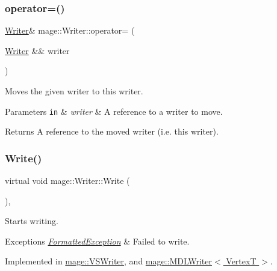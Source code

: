 \subsubsection{\texorpdfstring{operator=()}{operator=()}\hspace{0.1cm}{\footnotesize\ttfamily [2/2]}}
{\footnotesize\ttfamily \hyperlink{classmage_1_1_writer}{Writer}\& mage\+::\+Writer\+::operator= (\begin{DoxyParamCaption}\item[{\hyperlink{classmage_1_1_writer}{Writer} \&\&}]{writer }\end{DoxyParamCaption})\hspace{0.3cm}{\ttfamily [delete]}}

Moves the given writer to this writer.


\begin{DoxyParams}[1]{Parameters}
\mbox{\tt in}  & {\em writer} & A reference to a writer to move. \\
\hline
\end{DoxyParams}
\begin{DoxyReturn}{Returns}
A reference to the moved writer (i.\+e. this writer). 
\end{DoxyReturn}
\hypertarget{classmage_1_1_writer_a9baf695ef7f6180bef883f60bcb3ac07}{}\label{classmage_1_1_writer_a9baf695ef7f6180bef883f60bcb3ac07} 
\subsubsection{\texorpdfstring{Write()}{Write()}}
{\footnotesize\ttfamily virtual void mage\+::\+Writer\+::\+Write (\begin{DoxyParamCaption}{ }\end{DoxyParamCaption})\hspace{0.3cm}{\ttfamily [private]}, {}}

Starts writing.


\begin{DoxyExceptions}{Exceptions}
{\em \hyperlink{structmage_1_1_formatted_exception}{Formatted\+Exception}} & Failed to write. \\
\hline
\end{DoxyExceptions}


Implemented in \hyperlink{classmage_1_1_v_s_writer_a417c8bcf7ab26e88b253e9ffbdb60192}{mage\+::\+V\+S\+Writer}, and \hyperlink{classmage_1_1_m_d_l_writer_abd4f206b457d8b97e6e38e25f7e88ed3}{mage\+::\+M\+D\+L\+Writer$<$ Vertex\+T $>$}.

